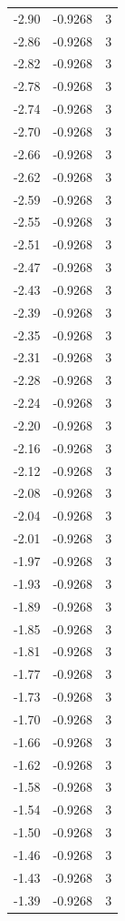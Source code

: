 \begin{longtable}{lrr}
  -2.90 & -0.9268 & 3 \\
  -2.86 & -0.9268 & 3 \\
  -2.82 & -0.9268 & 3 \\
  -2.78 & -0.9268 & 3 \\
  -2.74 & -0.9268 & 3 \\
  -2.70 & -0.9268 & 3 \\
  -2.66 & -0.9268 & 3 \\
  -2.62 & -0.9268 & 3 \\
  -2.59 & -0.9268 & 3 \\
  -2.55 & -0.9268 & 3 \\
  -2.51 & -0.9268 & 3 \\
  -2.47 & -0.9268 & 3 \\
  -2.43 & -0.9268 & 3 \\
  -2.39 & -0.9268 & 3 \\
  -2.35 & -0.9268 & 3 \\
  -2.31 & -0.9268 & 3 \\
  -2.28 & -0.9268 & 3 \\
  -2.24 & -0.9268 & 3 \\
  -2.20 & -0.9268 & 3 \\
  -2.16 & -0.9268 & 3 \\
  -2.12 & -0.9268 & 3 \\
  -2.08 & -0.9268 & 3 \\
  -2.04 & -0.9268 & 3 \\
  -2.01 & -0.9268 & 3 \\
  -1.97 & -0.9268 & 3 \\
  -1.93 & -0.9268 & 3 \\
  -1.89 & -0.9268 & 3 \\
  -1.85 & -0.9268 & 3 \\
  -1.81 & -0.9268 & 3 \\
  -1.77 & -0.9268 & 3 \\
  -1.73 & -0.9268 & 3 \\
  -1.70 & -0.9268 & 3 \\
  -1.66 & -0.9268 & 3 \\
  -1.62 & -0.9268 & 3 \\
  -1.58 & -0.9268 & 3 \\
  -1.54 & -0.9268 & 3 \\
  -1.50 & -0.9268 & 3 \\
  -1.46 & -0.9268 & 3 \\
  -1.43 & -0.9268 & 3 \\
  -1.39 & -0.9268 & 3 \\

\end{longtable}
